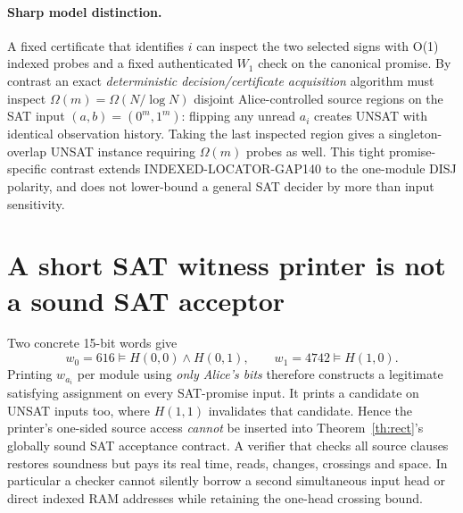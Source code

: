 \documentclass[11pt]{article}
\begin{document}
\paragraph{Sharp model distinction.}
A fixed certificate that identifies $i$ can inspect the two selected signs with O(1) indexed probes and a fixed authenticated $W_1$ check on the canonical promise. By contrast an exact \emph{deterministic decision/certificate acquisition} algorithm must inspect $\Omega(m)=\Omega(N/\log N)$ disjoint Alice-controlled source regions on the SAT input $(a,b)=(0^m,1^m)$: flipping any unread $a_i$ creates UNSAT with identical observation history. Taking the last inspected region gives a singleton-overlap UNSAT instance requiring $\Omega(m)$ probes as well. This tight promise-specific contrast extends INDEXED-LOCATOR-GAP140 to the one-module DISJ polarity, and does not lower-bound a general SAT decider by more than input sensitivity.

\section{A short SAT witness printer is not a sound SAT acceptor}
Two concrete 15-bit words give
\[
 w_0=616\models H(0,0)\land H(0,1),\qquad
 w_1=4742\models H(1,0).
\]
Printing $w_{a_i}$ per module using \emph{only Alice's bits} therefore constructs a legitimate satisfying assignment on every SAT-promise input. It prints a candidate on UNSAT inputs too, where $H(1,1)$ invalidates that candidate. Hence the printer's one-sided source access \emph{cannot} be inserted into Theorem~\ref{th:rect}'s globally sound SAT acceptance contract. A verifier that checks all source clauses restores soundness but pays its real time, reads, changes, crossings and space. In particular a checker cannot silently borrow a second simultaneous input head or direct indexed RAM addresses while retaining the one-head crossing bound.
\end{document}
